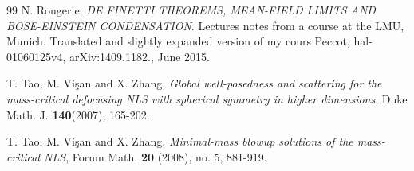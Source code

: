 \documentclass[reqno,11pt]{amsart}
\theoremstyle{plain}
\theoremstyle{definition}
\numberwithin{equation}{section}
\numberwithin{theorem}{section}
\begin{document}
\begin{thebibliography}{99}
N. Rougerie, \emph{DE FINETTI THEOREMS, MEAN-FIELD LIMITS AND BOSE-EINSTEIN CONDENSATION}. Lectures
notes from a course at the LMU, Munich. Translated and slightly expanded version of my cours Peccot, hal-01060125v4,
arXiv:1409.1182., June 2015.

 T. Tao, M. Vi\c{s}an and X. Zhang, \emph{Global
well-posedness and scattering for the mass-critical defocusing NLS with spherical symmetry in higher dimensions}, Duke Math. J. {\bf140}(2007), 165-202.

T. Tao, M. Vi\c{s}an and X. Zhang, \emph{Minimal-mass blowup solutions of the mass-critical NLS}, Forum Math. {\bf20} (2008), no. 5, 881-919.



\end{thebibliography}
\end{document}

